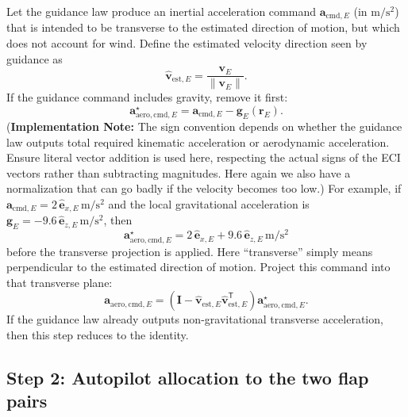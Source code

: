 Let the guidance law produce an inertial acceleration command \(\mathbf a_{\mathrm{cmd},E}\) (in \(\mathrm{m/s^2}\)) that is intended to be transverse to the estimated direction of motion, but which does not account for wind. Define the estimated velocity direction seen by guidance as
\begin{equation}
\hat{\mathbf v}_{\mathrm{est},E}
=
\frac{\mathbf v_E}{\|\mathbf v_E\|}.
\end{equation}
If the guidance command includes gravity, remove it first:
\begin{equation}
\mathbf a_{\mathrm{aero,cmd},E}^{\star}
=
\mathbf a_{\mathrm{cmd},E}-\mathbf g_E(\mathbf r_E). \label{eq:commanded_accel_star}
\end{equation}
(\textbf{Implementation Note:} The sign convention depends on whether the guidance law outputs total required kinematic acceleration or aerodynamic acceleration. Ensure literal vector addition is used here, respecting the actual signs of the ECI vectors rather than subtracting magnitudes. Here again we also have a normalization that can go badly if the velocity becomes too low.) 
For example, if \(\mathbf a_{\mathrm{cmd},E}=2\,\hat{\mathbf e}_{x,E}\,\mathrm{m/s^2}\) and the local gravitational acceleration is \(\mathbf g_E=-9.6\,\hat{\mathbf e}_{z,E}\,\mathrm{m/s^2}\), then
\[
\mathbf a_{\mathrm{aero,cmd},E}^{\star}=2\,\hat{\mathbf e}_{x,E}+9.6\,\hat{\mathbf e}_{z,E}\,\mathrm{m/s^2}
\]
before the transverse projection is applied. Here ``transverse'' simply means perpendicular to the estimated direction of motion. Project this command into that transverse plane:
\begin{equation}
\mathbf a_{\mathrm{aero,cmd},E}
=
\left(
\mathbf I-\hat{\mathbf v}_{\mathrm{est},E}\hat{\mathbf v}_{\mathrm{est},E}^{\mathsf T}
\right)
\mathbf a_{\mathrm{aero,cmd},E}^{\star}. \label{eq:commanded_accel_projected}
\end{equation}
If the guidance law already outputs non-gravitational transverse acceleration, then this step reduces to the identity.

\subsection{Step 2: Autopilot allocation to the two flap pairs}

